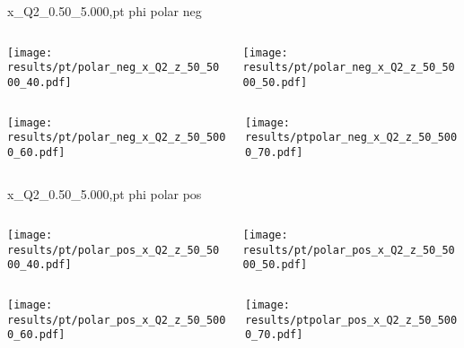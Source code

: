 \begin{frame}{x\_Q2\_0.50\_5.000,pt phi polar neg}
\begin{columns}
\begin{column}[T]{0.5\textwidth}
\texttt{[image: results/pt/polar\_neg\_x\_Q2\_z\_50\_5000\_40.pdf]}
\end{column}
\begin{column}[T]{0.5\textwidth}
\texttt{[image: results/pt/polar\_neg\_x\_Q2\_z\_50\_5000\_50.pdf]}
\end{column}
\end{columns}
\begin{columns}
\begin{column}[T]{0.5\textwidth}
\texttt{[image: results/pt/polar\_neg\_x\_Q2\_z\_50\_5000\_60.pdf]}
\end{column}
\begin{column}[T]{0.5\textwidth}
\texttt{[image: results/ptpolar\_neg\_x\_Q2\_z\_50\_5000\_70.pdf]}
\end{column}
\end{columns}
\end{frame}
\begin{frame}{x\_Q2\_0.50\_5.000,pt phi polar pos}
\begin{columns}
\begin{column}[T]{0.5\textwidth}
\texttt{[image: results/pt/polar\_pos\_x\_Q2\_z\_50\_5000\_40.pdf]}
\end{column}
\begin{column}[T]{0.5\textwidth}
\texttt{[image: results/pt/polar\_pos\_x\_Q2\_z\_50\_5000\_50.pdf]}
\end{column}
\end{columns}
\begin{columns}
\begin{column}[T]{0.5\textwidth}
\texttt{[image: results/pt/polar\_pos\_x\_Q2\_z\_50\_5000\_60.pdf]}
\end{column}
\begin{column}[T]{0.5\textwidth}
\texttt{[image: results/ptpolar\_pos\_x\_Q2\_z\_50\_5000\_70.pdf]}
\end{column}
\end{columns}
\end{frame}

